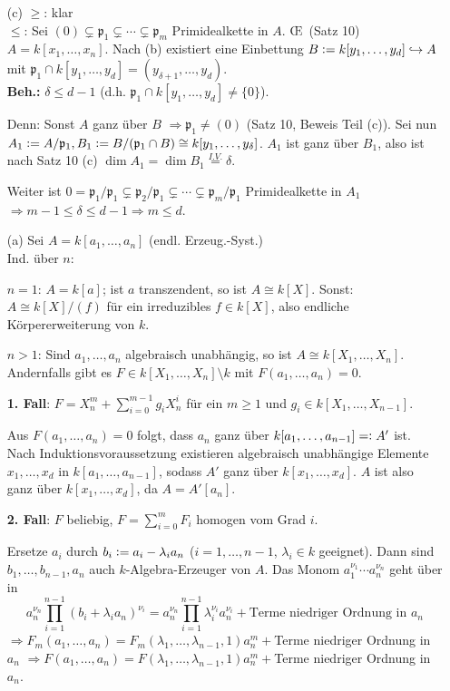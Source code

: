 \documentclass[a4paper, 10pt]{report}
\begin{document}
\begin{Bew}
\begin{enumerate}
\item[(c)] \glqq$\geq$\grqq: klar\\
\glqq$\leq$\grqq: Sei $(0)\subsetneq \mathfrak{p}_1\subsetneq \cdots\subsetneq \mathfrak{p}_m$ Primidealkette
in $A$. \OE\ (Satz 10) $A=k[x_1,\ldots, x_n]$. Nach (b) existiert eine Einbettung 
$B\mathrel{\mathop:}= k[y_1,\ldots,y_d]\hookrightarrow A$ mit $\mathfrak{p}_1\cap k[y_1,\ldots, y_d]
=(y_{\delta+1},\ldots, y_d)$.\\
\textbf{Beh.:} $\delta\leq d-1$ (d.h. $\mathfrak{p}_1\cap k[y_1,\ldots,y_d]\neq \{0\}$).

Denn: Sonst $A$ ganz \"uber $B$ $\Rightarrow \mathfrak{p}_1\not=(0)$ (Satz 10, Beweis Teil (c)).
Sei nun $A_1\mathrel{\mathop:}= A/\mathfrak{p}_1, B_1\mathrel{\mathop:}= B/(\mathfrak{p}_1\cap B)
\cong k[y_1,\ldots, y_\delta]$. $A_1$ ist ganz \"uber $B_1$, also ist nach Satz 10 (c)
$\dim{A_1}=\dim{B_1} \stackrel{I.V.}{=}\delta$.

Weiter ist $0=\mathfrak{p}_1/\mathfrak{p}_1\subsetneq \mathfrak{p}_2/\mathfrak{p}_1
\subsetneq \cdots \subsetneq \mathfrak{p}_m/\mathfrak{p}_1$ Primidealkette in $A_1$
$\Rightarrow m-1\leq \delta \leq d-1 \Rightarrow m\leq d$.

\item[(a)] Sei $A=k[a_1,\ldots, a_n]$  (endl. Erzeug.-Syst.)\\
Ind. \"uber $n$: 

$n=1$: $A=k[a]$; ist $a$ transzendent, so ist $A\cong k[X]$. Sonst: $A\cong k[X]/(f)$
f\"ur ein irreduzibles $f\in k[X]$, also endliche K\"orpererweiterung von $k$.

$n> 1$: Sind $a_1,\ldots, a_n$ algebraisch unabh\"angig, so ist $A\cong k[X_1,\ldots, X_n]$.
Andernfalls gibt es $F\in k[X_1, \ldots, X_n]\setminus k$ mit $F(a_1, \ldots,
a_n)=0$.

\textbf{1. Fall}: $F=X_n^m+\sum_{i=0}^{m-1}g_i X_n^i$ f\"ur ein $m\geq 1$ und
$g_i\in k[X_1,\ldots, X_{n-1}]$.

Aus $F(a_1, \ldots, a_n)=0$ folgt, dass $a_n$ ganz \"uber $k[a_1, \ldots,
a_{n-1}]=\mathrel{\mathop:} A'$ ist.
Nach Induktionsvoraussetzung existieren algebraisch unabh\"angige Elemente 
$x_1,\ldots,x_d$ in
$k[a_1,\ldots, a_{n-1}]$, sodass $A'$ ganz \"uber $k[x_1,\ldots,x_d]$. $A$ ist also ganz
\"uber $k[x_1, \ldots, x_d]$, da $A=A'[a_n]$.

\textbf{2. Fall}: $F$ beliebig, $F=\sum_{i=0}^{m}F_i$ homogen vom Grad $i$. 

Ersetze $a_i$ durch $b_i\mathrel{\mathop:}= a_i-\lambda_i a_n$ ($i=1,\ldots, n-1$, $\lambda_i\in k$
\glqq geeignet\grqq). Dann sind $b_1,\ldots, b_{n-1},a_n$ auch $k$-Algebra-Erzeuger
von $A$. Das Monom $a_1^{\nu_1}\cdots a_n^{\nu_n}$ geht \"uber in 
\[
a_n^{\nu_n}\prod_{i=1}^{n-1}(b_i+\lambda_i a_n)^{\nu_i}
=a_n^{\nu_n}\prod_{i=1}^{n-1} \lambda_i^{\nu_i} a_n^{\nu_i}+
\text{Terme niedriger Ordnung in } a_n
\]
$\Rightarrow F_m(a_1,\ldots,
a_n)=F_m(\lambda_1,\ldots,\lambda_{n-1},1)a_n^m+$Terme niedriger Ordnung in 
$a_n$ $\Rightarrow F(a_1,\ldots,
a_n)=F(\lambda_1,\ldots,\lambda_{n-1},1)a_n^m+$Terme niedriger Ordnung in $a_n$.


\end{enumerate}
\end{Bew}
\end{document}
